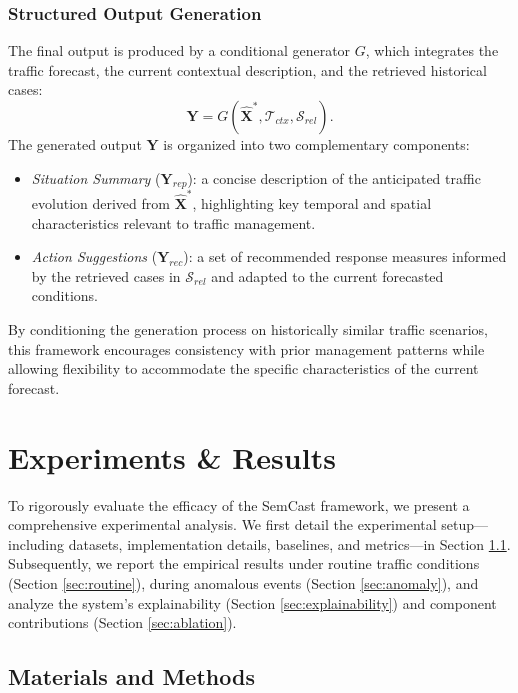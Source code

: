 \documentclass{article}
\begin{document}
\subsubsection{Structured Output Generation}

The final output is produced by a conditional generator $G$, which integrates the traffic forecast, the current contextual description, and the retrieved historical cases:
\begin{equation}
    \mathbf{Y} = G(\hat{\mathbf{X}}^*, \mathcal{T}_{ctx}, \mathcal{S}_{rel}).
\end{equation}
The generated output $\mathbf{Y}$ is organized into two complementary components:
\begin{itemize}
    \item \textit{Situation Summary} ($\mathbf{Y}_{rep}$): a concise description of the anticipated traffic evolution derived from $\hat{\mathbf{X}}^*$, highlighting key temporal and spatial characteristics relevant to traffic management.
    \item \textit{Action Suggestions} ($\mathbf{Y}_{rec}$): a set of recommended response measures informed by the retrieved cases in $\mathcal{S}_{rel}$ and adapted to the current forecasted conditions.
\end{itemize}

By conditioning the generation process on historically similar traffic scenarios, this framework encourages consistency with prior management patterns while allowing flexibility to accommodate the specific characteristics of the current forecast.


\section{Experiments \& Results}
To rigorously evaluate the efficacy of the SemCast framework, we present a comprehensive experimental analysis. We first detail the experimental setup—including datasets, implementation details, baselines, and metrics—in Section \ref{sec:setup}. Subsequently, we report the empirical results under routine traffic conditions (Section \ref{sec:routine}), during anomalous events (Section \ref{sec:anomaly}), and analyze the system's explainability (Section \ref{sec:explainability}) and component contributions (Section \ref{sec:ablation}).

\subsection{Materials and Methods}
\label{sec:setup}
\end{document}
